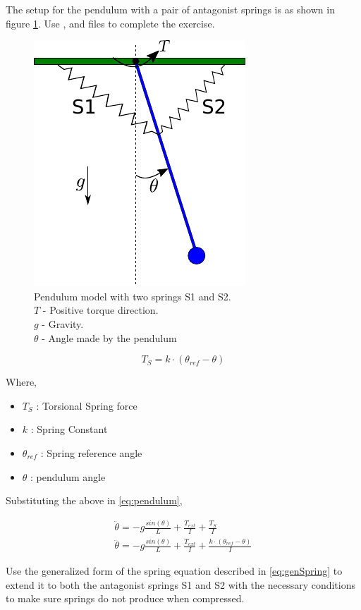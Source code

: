 \documentclass{cmc}
\begin{document}
The setup for the pendulum with a pair of antagonist springs is as
shown in figure \ref{fig:pendulum_spring}. Use ,
 and  files to
complete the exercise.


\begin{figure}[H]
  \centering
  \includegraphics[width=.3\textwidth]{figures/pendulum_spring}
  \caption[pendulum with spring]{Pendulum model with two springs S1
    and S2.\\
    $T$ - Positive torque direction.\\
    $g$ - Gravity.\\
    $\theta$ - Angle made by the pendulum}
  \label{fig:pendulum_spring}
\end{figure}


\begin{equation}
  \label{eqn:spring}
  T_{S} = k \cdot (\theta_{ref} - \theta)
\end{equation}

Where,
\begin{itemize}
\item $T_{S}$ : Torsional Spring force
\item $k$ : Spring Constant
\item $\theta_{ref}$ : Spring reference angle
\item $\theta$ : pendulum angle
\end{itemize}

Substituting the above in \ref{eq:pendulum},

\begin{eqnarray}
  \label{eq:spring}
  \ddot{\theta} = -g\frac{sin(\theta)}{L} + \frac{T_{ext}}{I} + \frac{T_{S}}{I} \\
  \ddot{\theta} = -g\frac{sin(\theta)}{L} + \frac{T_{ext}}{I} + \frac{k \cdot (\theta_{ref} - \theta)}{I} \label{eq:genSpring}
\end{eqnarray}

Use the generalized form of the spring equation described in
\ref{eq:genSpring} to extend it to both the antagonist springs S1 and
S2 with the necessary conditions to make sure springs do not produce
when compressed.
\end{document}
